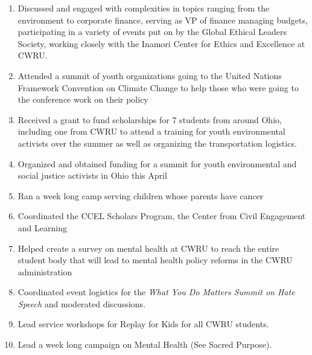       \begin{enumerate}
	\item Discussed and engaged with complexities in topics ranging from the environment to corporate finance, serving as VP of finance managing budgets, participating in a variety of events put on by the Global Ethical Leaders Society, working closely with the Inamori Center for Ethics and Excellence at CWRU.
      	\item Attended a summit of youth organizations going to the United Nations Framework Convention on Climate Change to help those who were going to the conference work on their policy
      	\item Received a grant to fund scholarships for 7 students from around Ohio, including one from CWRU to attend a training for youth environmental activists over the summer as well as organizing the transportation logistics.
      	\item Organized and obtained funding for a summit for youth environmental and social justice activists in Ohio this April
      	\item Ran a week long camp serving children whose parents have cancer
      	\item Coordinated the CCEL Scholars Program, the Center from Civil Engagement and Learning
      	\item Helped create a survey on mental health at CWRU to reach the entire student body that will lead to mental health policy reforms in the CWRU administration
      	\item Coordinated event logistics for the \textit{What You Do Matters Summit on Hate Speech} and moderated discussions.
      	\item Lead service workshops for Replay for Kids for all CWRU students.
      	\item Lead a week long campaign on Mental Health (See Sacred Purpose).
      \end{enumerate}
